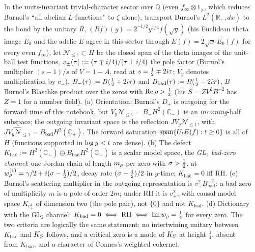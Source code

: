\begin{theorem}
\label{thm:gl1-bad-zero-defect}
In the units-invariant trivial-character sector over $\mathbb Q$ (even $f_\infty\otimes1_{\hat{\mathbb Z}}$, which reduces
Burnol's ``all abelian $L$-functions'' to $\zeta$ alone), transport Burnol's $L^2(\mathbb R_+,dx)$ to the bond by the unitary $R$, $(Rf)(y) = 2^{-1/2}y^{1/4}f(\sqrt y)$ (his Euclidean theta image $E_0$ and the adelic $E$ agree in this sector through $E(f) = 2\sqrt x\,E_0(f)$ for every even $f_\infty$), let $\mathcal N_{\le1}\subset H$ be the closed span of the theta
images of the unit-ball test functions, $v_\pm(\tau) := (\tau\mp i/4)/(\tau\pm i/4)$ the pole factor (Burnol's multiplier $(s-1)/s$ of $V = 1-A$, read at $s = \tfrac12\mp2i\tau$; $V_y$ denotes multiplication by
$v_-$), $B_-(\tau) := B(\tfrac12+2i\tau)$ and $B_{\mathrm{bad}}(\tau) := B(\tfrac12-2i\tau)$, $B$ Burnol's Blaschke product over the zeros
with $\operatorname{Re}\rho>\tfrac12$ (his $S = ZV^2B^{-2}$ has $Z = 1$ for a number field). (a) Orientation: Burnol's
$D_+$ is outgoing for the forward time of this notebook, but $V_y\mathcal N_{\le1} = B_-H^2(\mathbb C_-)$ is an
\emph{incoming}-half subspace; the outgoing invariant space is the reflection $JV_y\mathcal N_{\le1}$, with
$\widehat{JV_y\mathcal N_{\le1}} = B_{\mathrm{bad}}H^2(\mathbb C_+)$. The forward saturation $\overline{\mathrm{span}}
\{U_t E(f):t\ge0\}$ is all of $H$ (functions supported in $\log y<t$ are dense). (b) The defect
$K_{\mathrm{bad}} := H^2(\mathbb C_+)\ominus B_{\mathrm{bad}}H^2(\mathbb C_+)$ is a scalar model space, the \emph{GL$_1$
bad-zero channel}: one Jordan chain of length $m_\rho$ per zero with $\sigma>\tfrac12$, at $w^{(1)}_\rho = \gamma/2 +
i(\sigma-\tfrac12)/2$, decay rate $(\sigma-\tfrac12)/2$ in $y$-time; $K_{\mathrm{bad}} = 0$ iff RH. (c) Burnol's
scattering multiplier in the outgoing representation is $v_+^2B_{\mathrm{bad}}^{-2}$: a bad zero of multiplicity $m$
is a pole of order $2m$; under RH it is $v_+^2$, with causal model space $K_{v_+^2}$ of dimension two (the pole
pair), not $\{0\}$ and not $K_{\mathrm{bad}}$. (d) Dictionary with the GL$_2$ channel: $K_{\mathrm{bad}} = 0
\iff \mathrm{RH}\iff\operatorname{Im} w_\rho = \tfrac14$ for every zero. The two criteria are logically the same statement; no
intertwining unitary between $K_{\mathrm{bad}}$ and $K_S$ follows, and a critical zero is a mode of $K_S$ at height
$\tfrac14$, absent from $K_{\mathrm{bad}}$, and a character of Connes's weighted cokernel.
\end{theorem}

